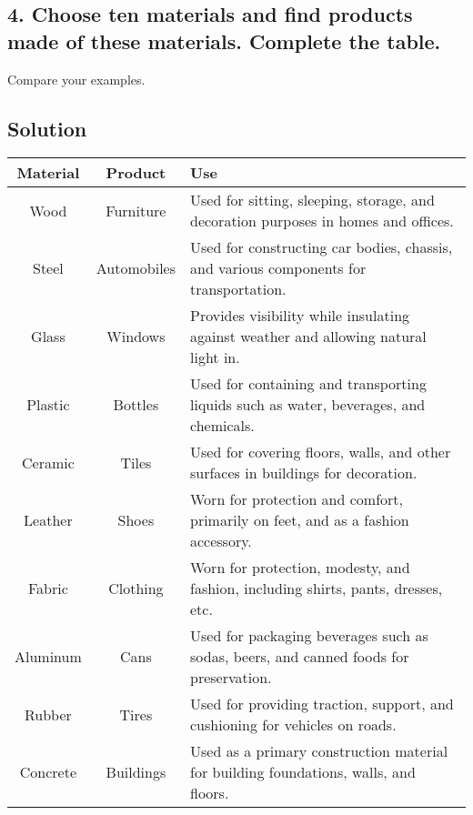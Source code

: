 \subsection*{4. Choose ten materials and find products made of these materials. Complete the table.}
Compare your examples.

\subsection*{Solution}
\begin{table}[htbp]
      \centering
      \begin{tabular}{|c|c|p{10cm}|}
            \hline
            \textbf{Material} & \textbf{Product} & \textbf{Use}                                                                          \\
            \hline
            Wood              & Furniture        & Used for sitting, sleeping, storage, and decoration purposes in homes and offices.    \\
            Steel             & Automobiles      & Used for constructing car bodies, chassis, and various components for transportation. \\
            Glass             & Windows          & Provides visibility while insulating against weather and allowing natural light in.   \\
            Plastic           & Bottles          & Used for containing and transporting liquids such as water, beverages, and chemicals. \\
            Ceramic           & Tiles            & Used for covering floors, walls, and other surfaces in buildings for decoration.      \\
            Leather           & Shoes            & Worn for protection and comfort, primarily on feet, and as a fashion accessory.       \\
            Fabric            & Clothing         & Worn for protection, modesty, and fashion, including shirts, pants, dresses, etc.     \\
            Aluminum          & Cans             & Used for packaging beverages such as sodas, beers, and canned foods for preservation. \\
            Rubber            & Tires            & Used for providing traction, support, and cushioning for vehicles on roads.           \\
            Concrete          & Buildings        & Used as a primary construction material for building foundations, walls, and floors.  \\
            \hline
      \end{tabular}
\end{table}

